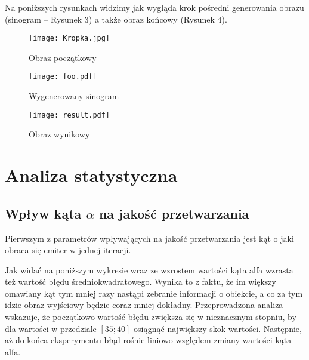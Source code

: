 \documentclass{article}
\begin{document}
Na poniższych rysunkach widzimy jak wygląda krok pośredni generowania obrazu (sinogram -- Rysunek 3) a także obraz końcowy (Rysunek 4).

\begin{figure}[!htbp]
\begin{center}
\texttt{[image: Kropka.jpg]}
\end{center}
\caption{Obraz początkowy}
\label{fig:1Tdelta}
\end{figure}

\begin{figure}[!htbp]
\begin{center}
\texttt{[image: foo.pdf]}
\end{center}
\caption{Wygenerowany sinogram}
\label{fig:1Tdelta}
\end{figure}

\begin{figure}[!htbp]
\begin{center}
\texttt{[image: result.pdf]}
\end{center}
\caption{Obraz wynikowy}
\label{fig:1Tdelta}
\end{figure}

\clearpage %


\section{Analiza statystyczna}
\label{sec_analiza_statystyczna}

\subsection{Wpływ kąta $\alpha$ na jakość przetwarzania}
\label{subsec_alpha_comparison}

Pierwszym z parametrów wpływających na jakość przetwarzania jest kąt o jaki obraca się emiter w jednej iteracji. 


Jak widać na poniższym wykresie wraz ze wzrostem wartości kąta alfa wzrasta też wartość błędu średniokwadratowego. Wynika to z faktu, że im większy omawiany kąt tym mniej razy nastąpi zebranie informacji o obiekcie, a co za tym idzie obraz wyjściowy będzie coraz mniej dokładny. 
Przeprowadzona analiza wskazuje, że początkowo wartość błędu zwiększa się w nieznacznym stopniu, by dla wartości w przedziale $\left[ 35; 40 \right]$ osiągnąć największy skok wartości. Następnie, aż do końca eksperymentu błąd rośnie liniowo względem zmiany wartości kąta alfa.
\end{document}
